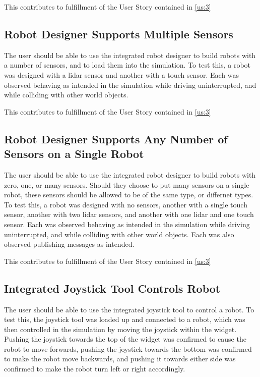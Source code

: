 This contributes to fulfillment of the User Story contained in \ref{us:3}

\subsection{Robot Designer Supports Multiple Sensors}
The user should be able to use the integrated robot designer to build robots with a number of sensors, and to load them into the simulation. To test this, a robot was designed with a lidar sensor and another with a touch sensor. Each was observed behaving as intended in the simulation while driving uninterrupted, and while colliding with other world objects.

This contributes to fulfillment of the User Story contained in \ref{us:3}

\subsection{Robot Designer Supports Any Number of Sensors on a Single Robot}
The user should be able to use the integrated robot designer to build robots with zero, one, or many sensors. Should they choose to put many sensors on a single robot, these sensors should be allowed to be of the same type, or differnet types. To test this, a robot was designed with no sensors, another with a single touch sensor, another with two lidar sensors, and another with one lidar and one touch sensor. Each was observed behaving as intended in the simulation while driving uninterrupted, and while colliding with other world objects. Each was also observed publishing messages as intended.

This contributes to fulfillment of the User Story contained in \ref{us:3}

\subsection{Integrated Joystick Tool Controls Robot}
The user should be able to use the integrated joystick tool to control a robot. To test this, the joystick tool was loaded up and connected to a robot, which was then controlled in the simulation by moving the joystick within the widget. Pushing the joystick towards the top of the widget was confirmed to cause the robot to move forwards, pushing the joystick towards the bottom was confirmed to make the robot move backwards, and pushing it towards either side was confirmed to make the robot turn left or right accordingly.

